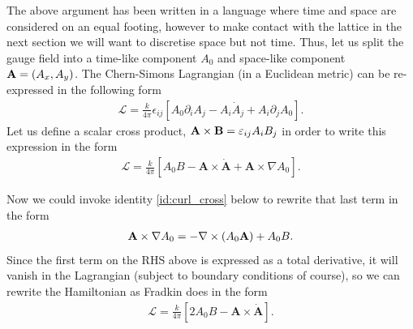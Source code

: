 \documentclass[11pt, oneside]{article} %
\numberwithin{equation}{section}
\begin{document}
The above argument has been written in a language where time and space are considered on an equal footing, however to make contact with the lattice in the next section we will want to discretise space but not time. Thus, let us split the gauge field into a time-like component $A_0$ and space-like component $\textbf A = (A_x, A_y)$. The Chern-Simons Lagrangian (in a Euclidean metric) can be re-expressed in the following form
\begin{align}\label{eqn:action_special_time_unfixed}
    \mathcal L = \frac{k}{4\pi} \epsilon_{ij} \left [  
    A_0  \partial_i A_j -
    A_i \dot A_j + 
    A_i \partial_j A_0
    \right ].
\end{align}
Let us define a scalar cross product, $\textbf A \times \textbf B = \varepsilon_{ij} A_i B_j $ in order to write this expression in the form
\begin{align}
    \mathcal L = \frac{k}{4\pi}
    \left [  
    A_0  B -
    \textbf {A} \times \dot {\textbf {A}} + 
    \textbf {A} \times \nabla A_0
    \right ].
\end{align}
\begin{shaded}
    Now we could invoke identity \ref{id:curl_cross} below to rewrite that last term in the form
    \begin{align}
        \textbf {A} \times \nabla A_0 = 
        - \nabla \times (A_0 \textbf A)
        +A_0 B.
    \end{align}
    Since the first term on the RHS above is expressed as a total derivative, it will vanish in the Lagrangian (subject to boundary conditions of course), so we can rewrite the Hamiltonian as Fradkin does in the form
    \begin{align}\label{eqn:fradkin_starting_point}
        \mathcal L = \frac{k}{4\pi}
        \left [  
        2A_0  B -
        \textbf {A} \times \dot {\textbf {A}}
        \right ].
    \end{align}
\end{shaded}
\end{document}
